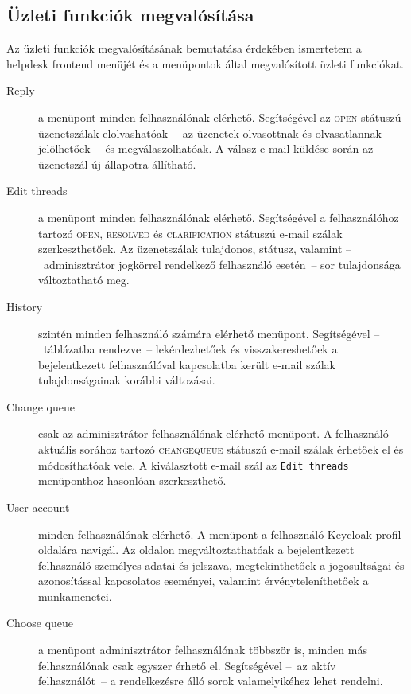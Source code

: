 \subsection{Üzleti funkciók megvalósítása}\label{sec:uzleti_funkciok}
Az üzleti funkciók megvalósításának bemutatása érdekében ismertetem a helpdesk frontend menüjét és a menüpontok által megvalósított üzleti funkciókat.
\begin{description}
	\item[Reply] a menüpont minden felhasználónak elérhető. Segítségével az \textsc{open} státuszú üzenetszálak elolvashatóak --~az üzenetek olvasottnak és olvasatlannak jelölhetőek~-- és megválaszolhatóak.
	A válasz e-mail küldése során az üzenetszál új állapotra állítható.
	
	\item[Edit threads] a menüpont minden felhasználónak elérhető. Segítségével a felhasználóhoz tartozó \textsc{open}, \textsc{resolved} és \textsc{clarification} státuszú e-mail szálak szerkeszthetőek. Az üzenetszálak tulajdonos, státusz, valamint --~adminisztrátor jogkörrel rendelkező felhasználó esetén~-- sor tulajdonsága változtatható meg.
	
	\item[History] szintén minden felhasználó számára elérhető menüpont. Segítségével --~táblázatba rendezve~-- lekérdezhetőek és visszakereshetőek a bejelentkezett felhasználóval kapcsolatba került e-mail szálak tulajdonságainak korábbi változásai.		
	
	\item[Change queue] csak az adminisztrátor felhasználónak elérhető menüpont. A felhasználó aktuális sorához tartozó \textsc{change\textunderscore queue} státuszú e-mail szálak érhetőek el és módosíthatóak vele. A kiválasztott e-mail szál az \texttt{Edit~threads} menüponthoz hasonlóan szerkeszthető.
	
	
	\item[User account] minden felhasználónak elérhető. A menüpont a felhasználó Keycloak profil oldalára navigál. Az oldalon megváltoztathatóak a bejelentkezett felhasználó személyes adatai és jelszava, megtekinthetőek a jogosultságai és azonosítással kapcsolatos eseményei, valamint érvényteleníthetőek a munkamenetei.
	
	\item[Choose queue] a menüpont adminisztrátor felhasználónak többször is, minden más felhasználónak csak egyszer érhető el. Segítségével --~az aktív felhasználót~-- a rendelkezésre álló sorok valamelyikéhez lehet rendelni.
	

\end{description}
